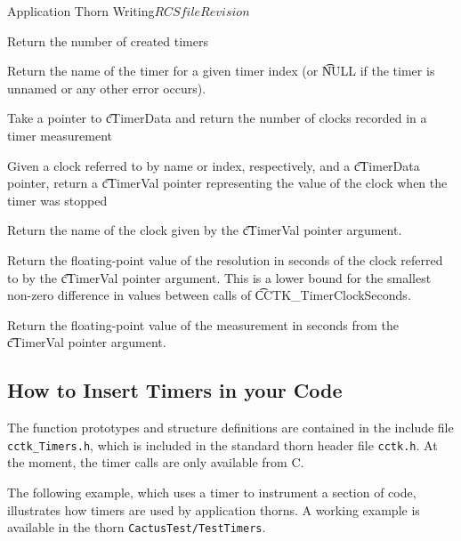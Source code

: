 \begin{cactuspart}{Application Thorn Writing}{$RCSfile$}{$Revision$}
\begin{Lentry}
Return the number of created timers

\item[{\t CCTK\_TimerName}]

Return the name of the timer for a given timer index (or {\t NULL} if 
the timer is unnamed or any other error occurs).

\item[{\t CCTK\_NumTimerClocks}]

Take a pointer to {\t cTimerData} and return the number of clocks 
recorded in a timer measurement

\item[{\t CCTK\_GetClockValue}, {\t CCTK\_GetClockValueI}]

Given a clock referred to by name or index, respectively, and a 
{\t cTimerData} pointer, return a {\t cTimerVal} pointer representing
the value of the clock when the timer was stopped

\item[{\t CCTK\_TimerClockName}]

Return the name of the clock given by the {\t cTimerVal} pointer argument.

\item[{\t CCTK\_TimerClockResolution}]

Return the floating-point value of the resolution in seconds 
of the clock referred to by the {\t cTimerVal} pointer argument.
This is a lower bound for the smallest non-zero difference in values
between calls of {\t CCTK\_TimerClockSeconds}.

\item[{\t CCTK\_TimerClockSeconds}]

Return the floating-point value of the measurement in seconds 
from the {\t cTimerVal} pointer argument.

\end{Lentry}

\subsection{How to Insert Timers in your Code}

The function prototypes and structure definitions are contained in the
include file \texttt{cctk\_Timers.h}, which is included in the standard
thorn header file \texttt{cctk.h}. At the moment, the timer calls are only
available from C.

The following example, which uses a timer  to
instrument a section of code, illustrates how timers are used by
application thorns. A working example is available in the thorn
\texttt{CactusTest/TestTimers}.


\end{cactuspart}

